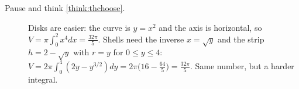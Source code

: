 \documentclass[11pt]{article}
\begin{document}
\begin{description}
  \item[Pause and think \ref{think:thchoose}.] Disks are easier: the curve is $y=x^2$ and the axis is horizontal, so $V=\pi\int_0^2x^4dx=\frac{32\pi}5$. Shells need the inverse $x=\sqrt y$ and the strip $h=2-\sqrt y$ with $r=y$ for $0\le y\le4$: $V=2\pi\int_0^4(2y-y^{3/2})dy=2\pi\bigl(16-\frac{64}5\bigr)=\frac{32\pi}5$. Same number, but a harder integral.

\end{description}
\end{document}
